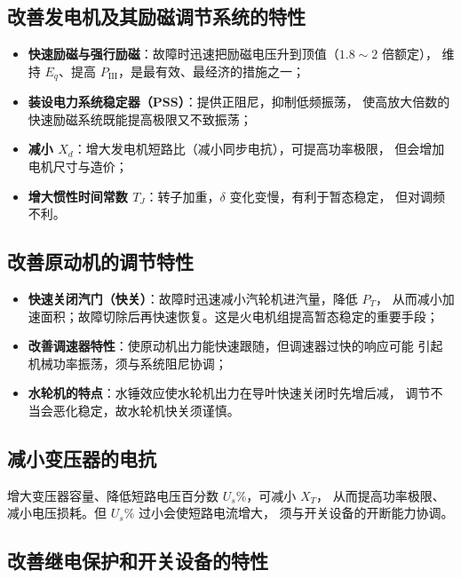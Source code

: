 \subsection{改善发电机及其励磁调节系统的特性}

\begin{itemize}
  \item \textbf{快速励磁与强行励磁}：故障时迅速把励磁电压升到顶值（$1.8\sim2$ 倍额定），
        维持 $E_q$、提高 $P_{\text{III}}$，是最有效、最经济的措施之一；
  \item \textbf{装设电力系统稳定器（PSS）}：提供正阻尼，抑制低频振荡，
        使高放大倍数的快速励磁系统既能提高极限又不致振荡；
  \item \textbf{减小 $X_d$}：增大发电机短路比（减小同步电抗），可提高功率极限，
        但会增加电机尺寸与造价；
  \item \textbf{增大惯性时间常数 $T_J$}：转子加重，$\delta$ 变化变慢，有利于暂态稳定，
        但对调频不利。
\end{itemize}

\subsection{改善原动机的调节特性}

\begin{itemize}
  \item \textbf{快速关闭汽门（快关）}：故障时迅速减小汽轮机进汽量，降低 $P_T$，
        从而减小加速面积；故障切除后再快速恢复。这是火电机组提高暂态稳定的重要手段；
  \item \textbf{改善调速器特性}：使原动机出力能快速跟随，但调速器过快的响应可能
        引起机械功率振荡，须与系统阻尼协调；
  \item \textbf{水轮机的特点}：水锤效应使水轮机出力在导叶快速关闭时先增后减，
        调节不当会恶化稳定，故水轮机快关须谨慎。
\end{itemize}

\subsection{减小变压器的电抗}

增大变压器容量、降低短路电压百分数 $U_s\%$，可减小 $X_T$，
从而提高功率极限、减小电压损耗。但 $U_s\%$ 过小会使短路电流增大，
须与开关设备的开断能力协调。

\subsection{改善继电保护和开关设备的特性}

